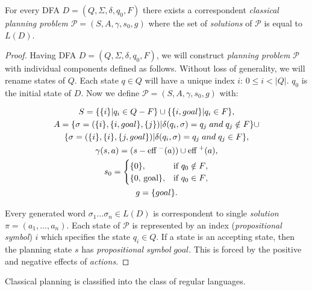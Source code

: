 \begin{thm}\label{thm02:2}
    For every DFA $D = (Q, \Sigma, \delta, q_0, F)$ there exists a correspondent \emph{classical planning problem $\mathcal{P} = (S, A, \gamma, s_0, g)$} where the set of \emph{solutions} of $\mathcal{P}$ is equal to $L(D)$.
\end{thm}
\begin{proof}
    Having DFA $D = (Q, \Sigma, \delta, q_0, F)$, we will construct \emph{planning problem} $\mathcal{P}$ with individual components defined as follows. Without loss of generality, we will rename states of $Q$. Each state $q \in Q$ will have a unique index $i$: $0 \leq i < |Q|$. $q_0$ is the initial state of $D$. Now we define $\mathcal{P} = (S, A, \gamma, s_0, g)$ with:

    \begin{gather*}
        S = \{{\{i\} | q_i \in Q - F}\} \cup \{{\{i, goal\} | q_i \in F}\}, \\
        A = \{ \sigma = ( \{i\}, \{i, goal\}, \{j\} ) | \delta(q_i,\sigma) = q_j \; and \; q_j \notin F\} \cup \\ \{ \sigma = ( \{i\}, \{i\}, \{j, goal\} ) | \delta(q_i,\sigma) = q_j \; and \; q_j \in F\}, \\
        \gamma(s,a)=(s-\text{eff}^{\,\,-}(a)) \cup \text{eff}^{\,\,+}(a), \\
        s_0 = 
            \begin{cases}
                $\{0\}$, & \text{if $q_0 \notin F$},\\
                $\{0, goal\}$, & \text{if $q_0 \in F$},
            \end{cases} \\
        g = \{ goal \}.
    \end{gather*}

    Every generated word $\sigma_1\dots\sigma_n \in L(D)$ is correspondent to single \emph{solution} $\pi = (a_1, \dots, a_n)$. Each state of $\mathcal{P}$ is represented by an index (\emph{propositional symbol}) $i$ which specifies the state $q_i \in Q$. If a state is an accepting state, then the planning state $s$ has \emph{propositional symbol} $goal$. This is forced by the positive and negative effects of \emph{actions}.
\end{proof}

\begin{cor}\label{cor2:1}
    Classical planning is classified into the class of regular languages.
\end{cor}

